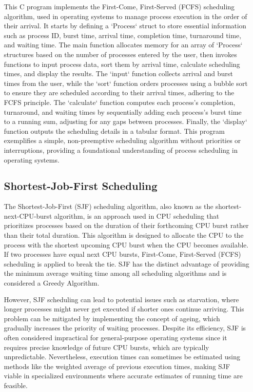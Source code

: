 \documentclass[conference]{IEEEtran}
\begin{document}
This C program implements the First-Come, First-Served (FCFS) scheduling algorithm, used in operating systems to manage process execution in the order of their arrival. It starts by defining a `Process` struct to store essential information such as process ID, burst time, arrival time, completion time, turnaround time, and waiting time. The main function allocates memory for an array of `Process` structures based on the number of processes entered by the user, then invokes functions to input process data, sort them by arrival time, calculate scheduling times, and display the results. The `input` function collects arrival and burst times from the user, while the `sort` function orders processes using a bubble sort to ensure they are scheduled according to their arrival times, adhering to the FCFS principle. The `calculate` function computes each process's completion, turnaround, and waiting times by sequentially adding each process's burst time to a running sum, adjusting for any gaps between processes. Finally, the `display` function outputs the scheduling details in a tabular format. This program exemplifies a simple, non-preemptive scheduling algorithm without priorities or interruptions, providing a foundational understanding of process scheduling in operating systems.

\subsection{Shortest-Job-First Scheduling}

The Shortest-Job-First (SJF) scheduling algorithm, also known as the shortest-next-CPU-burst algorithm, is an approach used in CPU scheduling that prioritizes processes based on the duration of their forthcoming CPU burst rather than their total duration\cite{fayyaz2017comparative}. This algorithm is designed to allocate the CPU to the process with the shortest upcoming CPU burst when the CPU becomes available. If two processes have equal next CPU bursts, First-Come, First-Served (FCFS) scheduling is applied to break the tie. SJF has the distinct advantage of providing the minimum average waiting time among all scheduling algorithms and is considered a Greedy Algorithm.

However, SJF scheduling can lead to potential issues such as starvation, where longer processes might never get executed if shorter ones continue arriving\cite{al2020comparative}. This problem can be mitigated by implementing the concept of ageing, which gradually increases the priority of waiting processes\cite{al2020comparative}. Despite its efficiency, SJF is often considered impractical for general-purpose operating systems since it requires precise knowledge of future CPU bursts, which are typically unpredictable\cite{fayyaz2017comparative}. Nevertheless, execution times can sometimes be estimated using methods like the weighted average of previous execution times, making SJF viable in specialized environments where accurate estimates of running time are feasible. 
\end{document}
